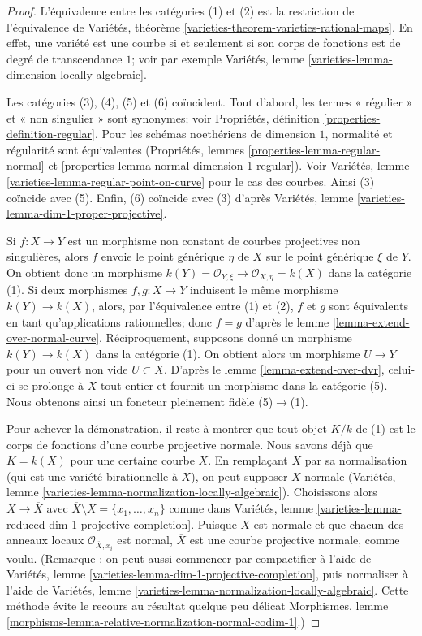 \begin{proof}
L'équivalence entre les catégories (1) et (2) est la restriction de l'équivalence de Variétés, théorème \ref{varieties-theorem-varieties-rational-maps}. En effet, une variété est une courbe si et seulement si son corps de fonctions est de degré de transcendance $1$; voir par exemple Variétés, lemme \ref{varieties-lemma-dimension-locally-algebraic}.

\medskip\noindent
Les catégories (3), (4), (5) et (6) coïncident. Tout d'abord, les termes « régulier » et « non singulier » sont synonymes; voir Propriétés, définition \ref{properties-definition-regular}. Pour les schémas noethériens de dimension $1$, normalité et régularité sont équivalentes (Propriétés, lemmes \ref{properties-lemma-regular-normal} et \ref{properties-lemma-normal-dimension-1-regular}). Voir Variétés, lemme \ref{varieties-lemma-regular-point-on-curve} pour le cas des courbes. Ainsi (3) coïncide avec (5). Enfin, (6) coïncide avec (3) d'après Variétés, lemme \ref{varieties-lemma-dim-1-proper-projective}.

\medskip\noindent
Si $f : X \to Y$ est un morphisme non constant de courbes projectives non singulières, alors $f$ envoie le point générique $\eta$ de $X$ sur le point générique $\xi$ de $Y$. On obtient donc un morphisme $k(Y) = \mathcal{O}_{Y, \xi} \to \mathcal{O}_{X, \eta} = k(X)$ dans la catégorie (1). Si deux morphismes $f,g: X \to Y$ induisent le même morphisme $k(Y) \to k(X)$, alors, par l'équivalence entre (1) et (2), $f$ et $g$ sont équivalents en tant qu'applications rationnelles; donc $f=g$ d'après le lemme \ref{lemma-extend-over-normal-curve}. Réciproquement, supposons donné un morphisme $k(Y) \to k(X)$ dans la catégorie (1). On obtient alors un morphisme $U \to Y$ pour un ouvert non vide $U \subset X$. D'après le lemme \ref{lemma-extend-over-dvr}, celui-ci se prolonge à $X$ tout entier et fournit un morphisme dans la catégorie (5). Nous obtenons ainsi un foncteur pleinement fidèle (5)$\to$(1).

\medskip\noindent
Pour achever la démonstration, il reste à montrer que tout objet $K/k$ de (1) est le corps de fonctions d'une courbe projective normale. Nous savons déjà que $K = k(X)$ pour une certaine courbe $X$. En remplaçant $X$ par sa normalisation (qui est une variété birationnelle à $X$), on peut supposer $X$ normale (Variétés, lemme \ref{varieties-lemma-normalization-locally-algebraic}). Choisissons alors $X \to \overline{X}$ avec $\overline{X} \setminus X = \{x_1, \ldots, x_n\}$ comme dans Variétés, lemme \ref{varieties-lemma-reduced-dim-1-projective-completion}. Puisque $X$ est normale et que chacun des anneaux locaux $\mathcal{O}_{\overline{X}, x_i}$ est normal, $\overline{X}$ est une courbe projective normale, comme voulu. (Remarque : on peut aussi commencer par compactifier à l'aide de Variétés, lemme \ref{varieties-lemma-dim-1-projective-completion}, puis normaliser à l'aide de Variétés, lemme \ref{varieties-lemma-normalization-locally-algebraic}. Cette méthode évite le recours au résultat quelque peu délicat Morphismes, lemme \ref{morphisms-lemma-relative-normalization-normal-codim-1}.)
\end{proof}

